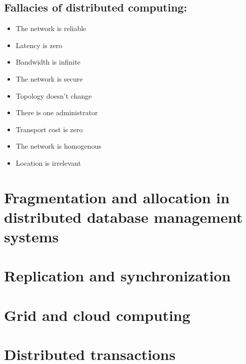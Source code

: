 \documentclass[10pt,a4paper]{article}
\begin{document}
\subsection{Fallacies of distributed computing:}
	\begin{itemize}
		\item The network is reliable
		\item Latency is zero
		\item Bandwidth is infinite
		\item The network is secure
		\item Topology doesn't change
		\item There is one administrator
		\item Transport cost is zero
		\item The network is homogenous
		\item Location is irrelevant
	\end{itemize}

\section{Fragmentation and allocation in distributed database management systems}

\section{Replication and synchronization}

\section{Grid and cloud computing}

\section{Distributed transactions}

\end{document}
